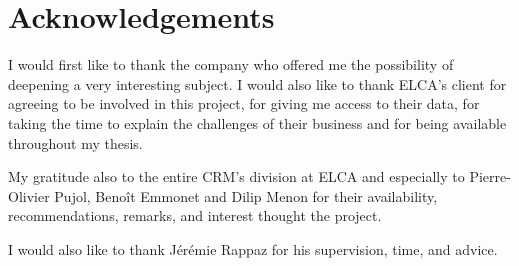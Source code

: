 \chapter*{Acknowledgements}

\vspace{0.5cm}

I would first like to thank the company who offered me the possibility of deepening a very interesting subject. I would also like to thank ELCA's client for agreeing to be involved in this project, for giving me access to their data, for taking the time to explain the challenges of their business and for being available throughout my thesis.

\par

My gratitude also to the entire CRM's division at ELCA and especially to Pierre-Olivier Pujol, Benoît Emmonet and Dilip Menon for their availability, recommendations, remarks, and interest thought the project.
\par

I would also like to thank Jérémie Rappaz for his supervision, time, and advice.